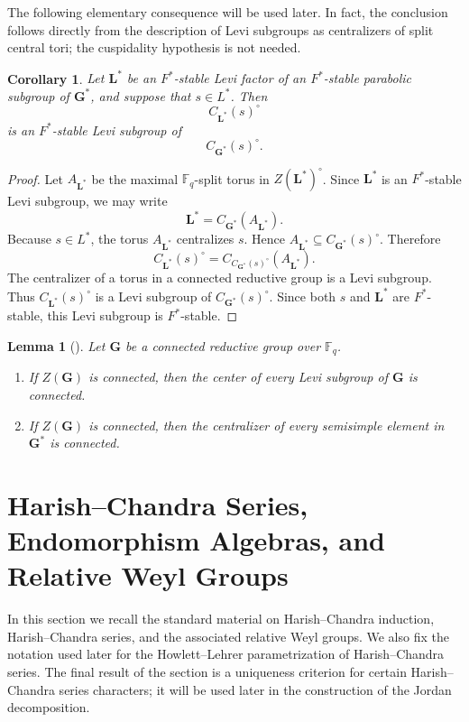 \documentclass{amsart}
\theoremstyle{plain}
\numberwithin{equation}{section}
\newtheorem{corollary}[theorem]{Corollary}
\newtheorem{lemma}[theorem]{Lemma}
\theoremstyle{definition}
\newcommand{\fq}{\mathbb{F}_{q}}
\newcommand{\bG}{\mathbf{G}}
\newcommand{\bL}{\mathbf{L}}
\begin{document}
The following elementary consequence will be used later.  In fact, the
conclusion follows directly from the description of Levi subgroups as
centralizers of split central tori; the cuspidality hypothesis is not needed.

\begin{corollary}
Let \(\bL^*\) be an \(F^*\)-stable Levi factor of an \(F^*\)-stable parabolic
subgroup of \(\bG^*\), and suppose that \(s\in L^*\).  Then
\[
C_{\bL^*}(s)^\circ
\]
is an \(F^*\)-stable Levi subgroup of
\[
C_{\bG^*}(s)^\circ .
\]
\end{corollary}

\begin{proof}
Let \(A_{\bL^*}\) be the maximal \(\fq\)-split torus in
\(Z(\bL^*)^\circ\).  Since \(\bL^*\) is an \(F^*\)-stable Levi subgroup, we
may write
\[
\bL^*=C_{\bG^*}(A_{\bL^*}).
\]
Because \(s\in L^*\), the torus \(A_{\bL^*}\) centralizes \(s\).  Hence
\(A_{\bL^*}\subseteq C_{\bG^*}(s)^\circ\).  Therefore
\[
C_{\bL^*}(s)^\circ
=
C_{C_{\bG^*}(s)^\circ}(A_{\bL^*}).
\]
The centralizer of a torus in a connected reductive group is a Levi subgroup.
Thus \(C_{\bL^*}(s)^\circ\) is a Levi subgroup of
\(C_{\bG^*}(s)^\circ\).  Since both \(s\) and \(\bL^*\) are \(F^*\)-stable, this
Levi subgroup is \(F^*\)-stable.
\end{proof}

\begin{lemma}[{\cite[Lemma~11.2.1]{Book:DigneandMichel}}]
\label{lem:connected-center-levi-centralizer}
Let \(\bG\) be a connected reductive group over \(\fq\).
\begin{enumerate}
    \item If \(Z(\bG)\) is connected, then the center of every Levi subgroup
    of \(\bG\) is connected.

    \item If \(Z(\bG)\) is connected, then the centralizer of every semisimple
    element in \(\bG^*\) is connected.
\end{enumerate}
\end{lemma}
\medskip
\section{Harish--Chandra Series, Endomorphism Algebras, and Relative Weyl Groups}
\label{sec:HC-series-endomorphism-algebras}

In this section we recall the standard material on Harish--Chandra induction,
Harish--Chandra series, and the associated relative Weyl groups.  We also fix
the notation used later for the Howlett--Lehrer parametrization of
Harish--Chandra series.  The final result of the section is a uniqueness
criterion for certain Harish--Chandra series characters; it will be used later
in the construction of the Jordan decomposition.
\end{document}

